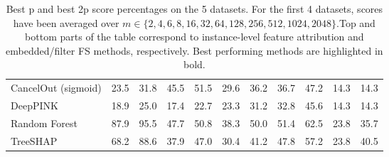 \begin{table}[h!]
{{\begin{tabular}{lrrrrrrrrrr}
CancelOut (sigmoid) & 23.5 & 31.8 & 45.5 & 51.5 & 29.6 & 36.2 & 36.7 & 47.2 & 14.3 & 14.3 \\
DeepPINK & 18.9 & 25.0 & 17.4 & 22.7 & 23.3 & 31.2 & 32.8 & 45.6 & 14.3 & 14.3 \\
Random Forest & 87.9 & 95.5 & 47.7 & 50.8 & 38.3 & 50.0 & 51.4 & 62.5 & 23.8 & 35.7 \\
TreeSHAP & 68.2 & 88.6 & 37.9 & 47.0 & 30.4 & 41.2 & 47.8 & 57.2 & 23.8 & 40.5 \\
\bottomrule
\end{tabular}}}{}
\caption{Best p and best 2p score percentages on the 5 datasets. For the first 4 datasets, scores have been averaged over $m \in \{2, 4, 6, 8, 16, 32, 64, 128, 256, 512, 1024, 2048\}$.Top and bottom parts of the table correspond to instance-level feature attribution and embedded/filter FS methods, respectively. Best performing methods are highlighted in bold.}
\end{table}
